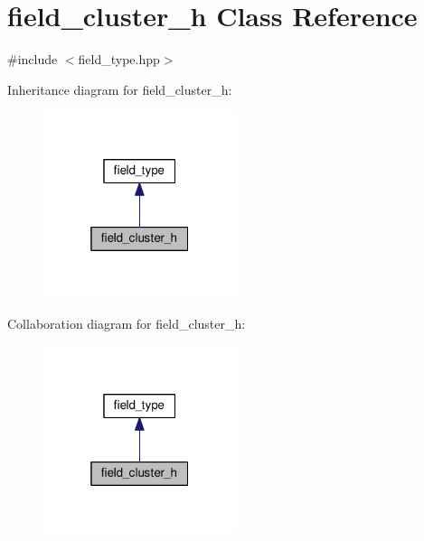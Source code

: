\hypertarget{classfield__cluster__h}{}\section{field\+\_\+cluster\+\_\+h Class Reference}
\label{classfield__cluster__h}


{\ttfamily \#include $<$field\+\_\+type.\+hpp$>$}



Inheritance diagram for field\+\_\+cluster\+\_\+h\+:\nopagebreak
\begin{figure}[H]
\begin{center}
\leavevmode
\includegraphics[width=160pt]{d0/d12/classfield__cluster__h__inherit__graph}
\end{center}
\end{figure}


Collaboration diagram for field\+\_\+cluster\+\_\+h\+:\nopagebreak
\begin{figure}[H]
\begin{center}
\leavevmode
\includegraphics[width=160pt]{d3/dd8/classfield__cluster__h__coll__graph}
\end{center}
\end{figure}
